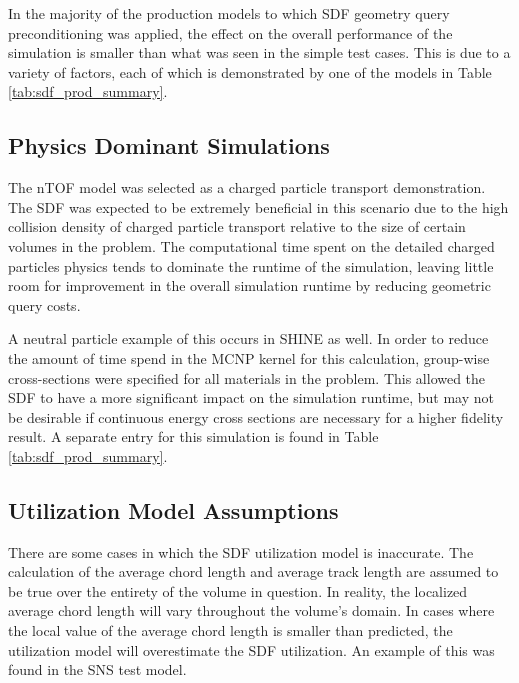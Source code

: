 In the majority of the production models to which SDF geometry query
preconditioning was applied, the effect on the overall performance of the
simulation is smaller than what was seen in the simple test cases. This is
due to a variety of factors, each of which is demonstrated by one of the models
in Table \ref{tab:sdf_prod_summary}.

\subsection{Physics Dominant Simulations}\label{subsec:sdf_phys_dominant}

The nTOF model was selected as a charged particle transport demonstration. The
SDF was expected to be extremely beneficial in this scenario due to the high
collision density of charged particle transport relative to the size of certain
volumes in the problem. The computational time spent on the detailed
charged particles physics tends to dominate the runtime of the simulation,
leaving little room for improvement in the overall simulation runtime by
reducing geometric query costs.

A neutral particle example of this occurs in SHINE as well. In order to reduce
the amount of time spend in the MCNP kernel for this calculation, group-wise
cross-sections were specified for all materials in the problem. This allowed the
SDF to have a more significant impact on the simulation runtime, but may not be
desirable if continuous energy cross sections are necessary for a higher
fidelity result. A separate entry for this simulation is found in Table
\ref{tab:sdf_prod_summary}.

\subsection{Utilization Model Assumptions}\label{subsec:sdf_util_model_limits}

There are some cases in which the SDF utilization model is inaccurate. The
calculation of the average chord length and average track length are assumed to
be true over the entirety of the volume in question. In reality, the localized
average chord length will vary throughout the volume's domain. In cases where
the local value of the average chord length is smaller than predicted, the
utilization model will overestimate the SDF utilization. An example of this was
found in the SNS test model.

